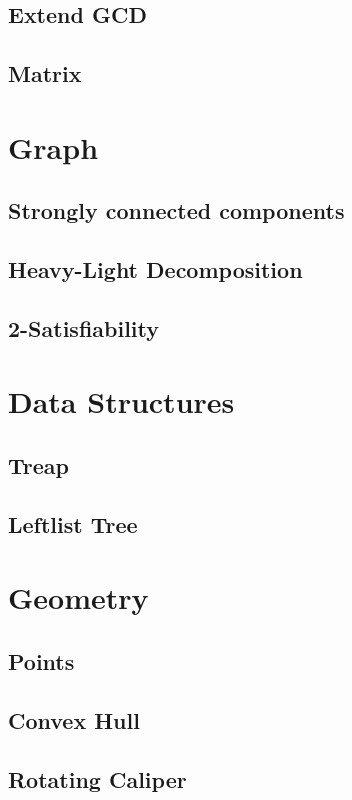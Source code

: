 \documentclass[a4paper,10pt,twocolumn,oneside]{article}
\begin{document}
\subsection{Extend GCD}

\subsection{Matrix}

\section{Graph}
\subsection{Strongly connected components}

\subsection{Heavy-Light Decomposition}

\subsection{2-Satisfiability}

\section{Data Structures}
\subsection{Treap}

\subsection{Leftlist Tree}

\section{Geometry}
\subsection{Points}

\subsection{Convex Hull}

\subsection{Rotating Caliper}

\end{document}

